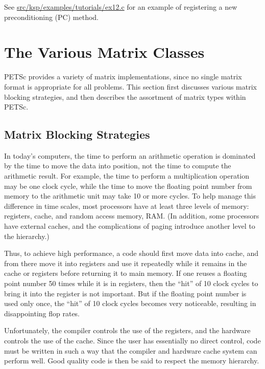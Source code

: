 \documentclass[twoside,12pt]{../sty/report_petsc}
\newcommand{\sindex}[1]{\index{#1}}
\begin{document}
See \href{http://www.mcs.anl.gov/petsc/petsc-master/src/ksp/ksp/examples/tutorials/ex12.c.html}{src/ksp/examples/tutorials/ex12.c} for an example of registering a new
preconditioning (PC) method.



\chapter{The Various Matrix Classes}
\label{sec:matclasses}

PETSc provides a variety of matrix implementations, since no single
matrix format is appropriate for all problems.  This section first
discusses various matrix blocking strategies, and then
describes the assortment of matrix types within PETSc.

\section{Matrix Blocking Strategies}
\sindex{matrix blocking}
\sindex{blocking}

In today's computers, the time to perform an arithmetic operation is
dominated by the time to move the data into position, not the time to
compute the arithmetic result.  For example, the time to perform a
multiplication operation may be one clock cycle, while the time to
move the floating point number from memory to the arithmetic unit may
take 10 or more cycles. To help manage this difference in time scales,
most processors have at least three levels of memory: registers,
cache, and random access memory, RAM. (In addition, some processors
have external caches, and the complications of paging introduce
another level to the hierarchy.)

Thus, to achieve high performance, a code should first move data into
cache, and from there move it into registers and use it repeatedly
while it remains in the cache or registers before returning it to main
memory. If one reuses a floating point number 50 times while it is in
registers, then the ``hit'' of 10 clock cycles to bring it into the
register is not important. But if the floating point number is used
only once, the ``hit'' of 10 clock cycles becomes very noticeable,
resulting in disappointing flop rates.

Unfortunately, the compiler controls the use of the registers, and the
hardware controls the use of the cache. Since the user has essentially
no direct control, code must be written in such a way that the
compiler and hardware cache system can perform well. Good quality code
is then be said to respect the memory hierarchy.
\end{document}
